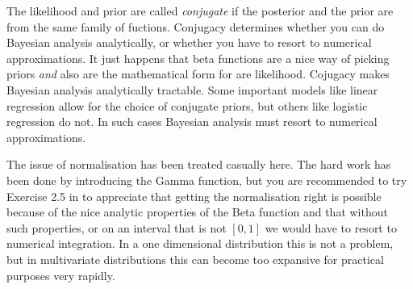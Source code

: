 The likelihood and prior are called  \emph{conjugate} if the posterior and the prior are from the same family of fuctions. Conjugacy determines whether you can do
Bayesian analysis analytically, or whether you have to resort to numerical approximations. It just happens that beta functions are a nice way of picking priors
\emph{and} also are the mathematical form for are likelihood. Cojugacy makes Bayesian analysis analytically tractable. Some important models like linear regression
allow for the choice of conjugate priors, but others like logistic regression do not. In such cases Bayesian analysis must resort to numerical approximations.

The issue of normalisation has been treated casually here. The hard work has been done by introducing the Gamma function, but you are recommended to try  Exercise
2.5 in \cite{bishop2006} to appreciate that getting the normalisation right is possible because of the nice analytic properties of the Beta function and that without
such properties, or on an interval that is not $[0,1]$ we would have to resort to numerical integration. In a one dimensional distribution this is not a problem, but in
multivariate distributions this can become too expansive for practical purposes very rapidly.



  
  


  
